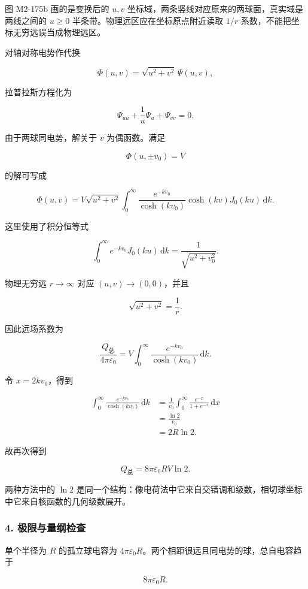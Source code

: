 图 M2-175b 画的是变换后的 \(u,v\)
坐标域，两条竖线对应原来的两球面，真实域是两线之间的 \(u\ge0\)
半条带。物理远区应在坐标原点附近读取 \(1/r\)
系数，不能把坐标无穷远误当成物理远区。

对轴对称电势作代换

\[
\Phi(u,v)=\sqrt{u^2+v^2}\,\Psi(u,v),
\]

拉普拉斯方程化为

\[
\Psi_{uu}+\frac1u\Psi_u+\Psi_{vv}=0.
\]

由于两球同电势，解关于 \(v\) 为偶函数。满足

\[
\Phi(u,\pm v_0)=V
\]

的解可写成

\[
\Phi(u,v)
=
V\sqrt{u^2+v^2}
\int_0^{\infty}
\frac{e^{-kv_0}}{\cosh(kv_0)}
\cosh(kv)J_0(ku)\,\mathrm dk.
\]

这里使用了积分恒等式

\[
\int_0^{\infty} e^{-kv_0}J_0(ku)\,\mathrm dk
=
\frac1{\sqrt{u^2+v_0^2}}.
\]

物理无穷远 \(r\to\infty\) 对应 \((u,v)\to(0,0)\)，并且

\[
\sqrt{u^2+v^2}=\frac1r.
\]

因此远场系数为

\[
\frac{Q_{\text{总}}}{4\pi\varepsilon_0}
=
V\int_0^{\infty}
\frac{e^{-kv_0}}{\cosh(kv_0)}\,\mathrm dk.
\]

令 \(x=2kv_0\)，得到

\[
\begin{aligned}
\int_0^{\infty}
\frac{e^{-kv_0}}{\cosh(kv_0)}\,\mathrm dk
&=
\frac1{v_0}
\int_0^{\infty}
\frac{e^{-x}}{1+e^{-x}}\,\mathrm dx\\
&=
\frac{\ln2}{v_0}\\
&=
2R\ln2.
\end{aligned}
\]

故再次得到

\[
Q_{\text{总}}
=
8\pi\varepsilon_0RV\ln2.
\]

两种方法中的 \(\ln2\)
是同一个结构：像电荷法中它来自交错调和级数，相切球坐标中它来自核函数的几何级数展开。

\subsubsection{4.
极限与量纲检查}\label{m2:ux6781ux9650ux4e0eux91cfux7eb2ux68c0ux67e5}

单个半径为 \(R\) 的孤立球电容为
\(4\pi\varepsilon_0R\)。两个相距很远且同电势的球，总自电容趋于

\[
8\pi\varepsilon_0R.
\]

